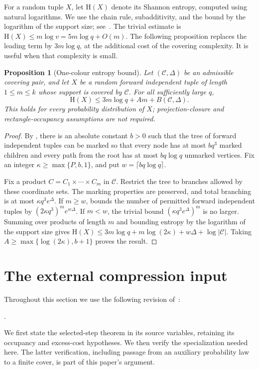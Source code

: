 \documentclass[11pt,a4paper]{article}
\numberwithin{equation}{section}
\newtheorem{proposition}[theorem]{Proposition}
\newcommand{\HH}{\mathrm H}
\newcommand{\cC}{\mathcal C}
\newcommand{\src}[1]{\texttt{\detokenize{#1}}}
\begin{document}
For a random tuple $X$, let $\HH(X)$ denote its Shannon entropy,
computed using natural logarithms. We use the chain rule,
subadditivity, and the bound by the logarithm of the support size;
see~\cite[Chapter~2]{CT}.
The trivial estimate is $\HH(X)\le m\log v=5m\log q+O(m)$.
The following proposition replaces the leading term by
$3m\log q$, at the additional cost of the covering complexity.
It is useful when that complexity is small.

\begin{proposition}[One-colour entropy bound]\label{prop:entropy}
Let $(\cC,\Delta)$ be an admissible covering pair, and let $X$
be a random forward independent tuple of length $1\le m\le k$
whose support is covered by $\cC$.
For all sufficiently large $q$,
\begin{equation}\label{eq:entropy-upper}
 \HH(X)\le3m\log q+Am+B(\cC,\Delta).
\end{equation}
This holds for every probability distribution of $X$;
projection-closure and rectangle-occupancy assumptions are not required.
\end{proposition}

\begin{proof}
By \cite[Claim~2.13, with parameter $3$]{Bradac}, there is an
absolute constant $b>0$ such that the tree of forward independent
tuples can be marked so that every node has at most $bq^3$ marked
children and every path from the root has at most $bq\log q$
unmarked vertices. Fix an integer $\kappa\ge\max\{P,b,1\}$,
and put $w=\lceil bq\log q\rceil$.

Fix a product $C=C_1\times\cdots\times C_m$ in $\cC$.
Restrict the tree to branches allowed by these coordinate sets.
The marking properties are preserved, and total branching is at
most $\kappa q^3e^\Delta$.
If $m\ge w$, \cite[Lemma~2.7]{Bradac} bounds the number of
permitted forward independent tuples by
$(2\kappa q^3)^m e^{w\Delta}$.
If $m<w$, the trivial bound $(\kappa q^3e^\Delta)^m$ is no larger.
Summing over products of length $m$ and bounding entropy by the
logarithm of the support size gives
$\HH(X)\le3m\log q+m\log(2\kappa)+w\Delta+\log|\cC|$.
Taking $A\ge\max\{\log(2\kappa),b+1\}$ proves the result.
\end{proof}

\section{The external compression input}\label{sec:compression}

Throughout this section we use the following revision of~\cite{OAI}:
\begin{center}
\src{adc7f1241b42e322a6451854ab7e4b4c146bf78a}.
\end{center}
We first state the selected-step theorem in its
source variables, retaining its occupancy and excess-cost
hypotheses. We then verify the specialization needed here.
The latter verification, including passage from an auxiliary
probability law to a finite cover, is part of this paper's argument.
\end{document}
